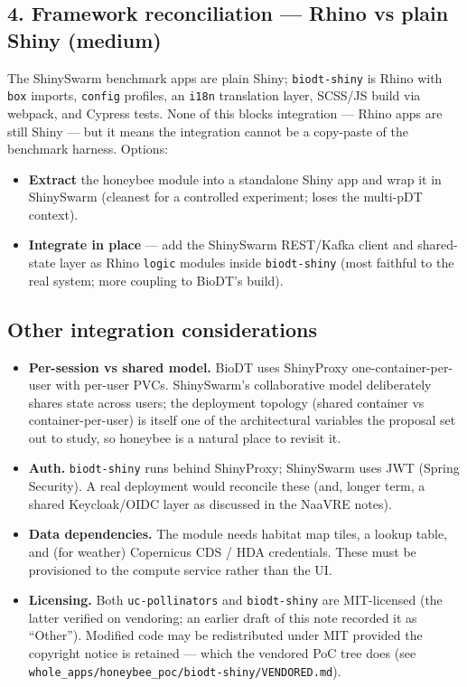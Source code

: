 \documentclass[12pt,a4paper]{article}
\begin{document}
\subsection{4. Framework reconciliation --- Rhino vs plain Shiny (medium)}

The ShinySwarm benchmark apps are plain Shiny; \texttt{biodt-shiny} is Rhino with
\texttt{box} imports, \texttt{config} profiles, an \texttt{i18n} translation
layer, SCSS/JS build via webpack, and Cypress tests. None of this blocks
integration --- Rhino apps are still Shiny --- but it means the integration cannot
be a copy-paste of the benchmark harness. Options:
\begin{itemize}[nosep]
  \item \textbf{Extract} the honeybee module into a standalone Shiny app and wrap
    it in ShinySwarm (cleanest for a controlled experiment; loses the multi-pDT
    context).
  \item \textbf{Integrate in place} --- add the ShinySwarm REST/Kafka client and
    shared-state layer as Rhino \texttt{logic} modules inside \texttt{biodt-shiny}
    (most faithful to the real system; more coupling to BioDT's build).
\end{itemize}

\subsection{Other integration considerations}

\begin{itemize}[nosep]
  \item \textbf{Per-session vs shared model.} BioDT uses ShinyProxy
    one-container-per-user with per-user PVCs. ShinySwarm's collaborative model
    deliberately shares state across users; the deployment topology (shared
    container vs container-per-user) is itself one of the architectural variables
    the proposal set out to study, so honeybee is a natural place to revisit it.
  \item \textbf{Auth.} \texttt{biodt-shiny} runs behind ShinyProxy; ShinySwarm
    uses JWT (Spring Security). A real deployment would reconcile these (and,
    longer term, a shared Keycloak/OIDC layer as discussed in the NaaVRE notes).
  \item \textbf{Data dependencies.} The module needs habitat map tiles, a lookup
    table, and (for weather) Copernicus CDS / HDA credentials. These must be
    provisioned to the compute service rather than the UI.
  \item \textbf{Licensing.} Both \texttt{uc-pollinators} and \texttt{biodt-shiny}
    are MIT-licensed (the latter verified on vendoring; an earlier draft of this
    note recorded it as ``Other''). Modified code may be redistributed under MIT
    provided the copyright notice is retained --- which the vendored PoC tree does
    (see \texttt{whole\_apps/honeybee\_poc/biodt-shiny/VENDORED.md}).
\end{itemize}
\end{document}
